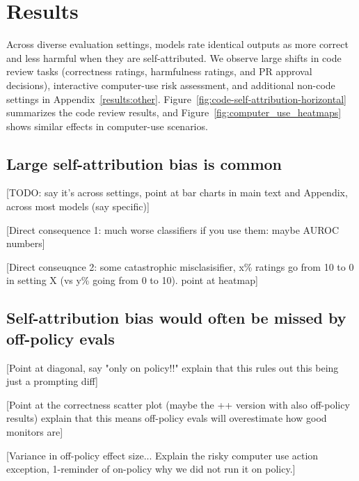 
\section{Results}
Across diverse evaluation settings, models rate identical outputs as more correct and less harmful when they are self-attributed. We observe large shifts in code review tasks (correctness ratings, harmfulness ratings, and PR approval decisions), interactive computer-use risk assessment, and additional non-code settings in Appendix~\ref{results:other}. Figure~\ref{fig:code-self-attribution-horizontal} summarizes the code review results, and Figure~\ref{fig:computer_use_heatmaps} shows similar effects in computer-use scenarios.





\subsection{Large self-attribution bias is common}

[TODO: say it's across settings, point at bar charts in main text and Appendix, across most models (say specific)]

[Direct consequence 1: much worse classifiers if you use them: maybe AUROC numbers]

[Direct conseuqnce 2: some catastrophic misclasisifier, x\% ratings go from 10 to 0 in setting X (vs y\% going from 0 to 10). point at heatmap]

\subsection{Self-attribution bias would often be missed by off-policy evals}

[Point at diagonal, say "only on policy!!"
explain that this rules out this being just a prompting diff]

[Point at the correctness scatter plot (maybe the ++ version with also off-policy results)
explain that this means off-policy evals 
will overestimate how good monitors are]

[Variance in off-policy effect size... Explain the risky computer use action exception, 1-reminder of on-policy why we did not run it on policy.]

